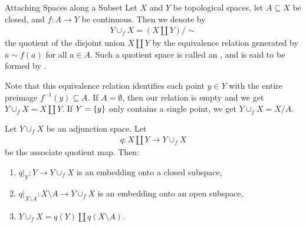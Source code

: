 \begin{importantdefinition}{Attaching Spaces along a Subset}{}
	Let $X$ and $Y$ be topological spaces, let $A \subseteq X$ be closed, and $f : A \to Y$ be continuous. Then we denote by
	\begin{align*}
		Y \cup_f X = (X \amalg Y) / \sim
	\end{align*}
	the quotient of the disjoint union $X \amalg Y$ by the equivalence relation generated by $a \sim f(a)$ for all $a \in A$. Such a quotient space is called an , and is said to be formed by .
\end{importantdefinition}
Note that this equivalence relation identifies each point $y \in Y$ with the entire preimage $f^{-1}(y) \subseteq A$. If $A = \emptyset$, then our relation is empty and we get $Y \cup_f X = X \amalg Y$. If $Y = \qty{y}$ only contains a single point, we get $Y \cup_f X = X/A$.
\begin{theorem}
	Let $Y \cup_f X$ be an adjunction space. Let
	\begin{align*}
		q : X \amalg Y \to Y \cup_f X
	\end{align*}
	be the associate quotient map. Then:
	\begin{enumerate}
		\item $q|_Y : Y \to Y \cup_f X$ is an embedding onto a closed subspace,
		\item $q|_{X \setminus A} : X \setminus A \to Y \cup_f X$ is an embedding onto an open subspace,
		\item $Y \cup_f X = q(Y) \amalg q(X \setminus A)$.
	\end{enumerate}
\end{theorem}
